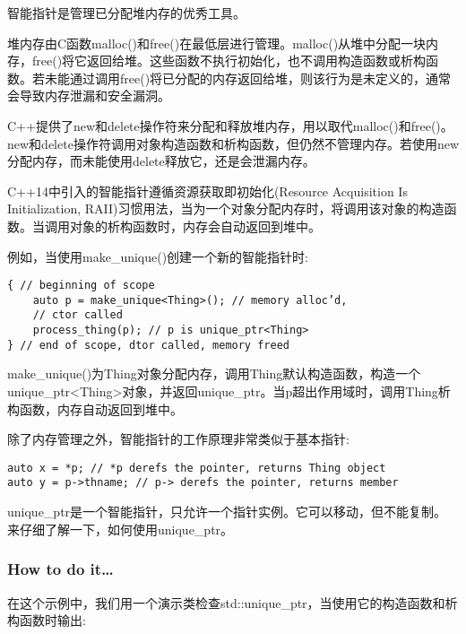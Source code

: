 
智能指针是管理已分配堆内存的优秀工具。

堆内存由C函数malloc()和free()在最低层进行管理。malloc()从堆中分配一块内存，free()将它返回给堆。这些函数不执行初始化，也不调用构造函数或析构函数。若未能通过调用free()将已分配的内存返回给堆，则该行为是未定义的，通常会导致内存泄漏和安全漏洞。

C++提供了new和delete操作符来分配和释放堆内存，用以取代malloc()和free()。new和delete操作符调用对象构造函数和析构函数，但仍然不管理内存。若使用new分配内存，而未能使用delete释放它，还是会泄漏内存。

C++14中引入的智能指针遵循资源获取即初始化(Resource Acquisition Is Initialization, RAII)习惯用法，当为一个对象分配内存时，将调用该对象的构造函数。当调用对象的析构函数时，内存会自动返回到堆中。

例如，当使用make\_unique()创建一个新的智能指针时:

\begin{lstlisting}[style=styleCXX]
{ // beginning of scope
	auto p = make_unique<Thing>(); // memory alloc’d,
	// ctor called
	process_thing(p); // p is unique_ptr<Thing>
} // end of scope, dtor called, memory freed
\end{lstlisting}

make\_unique()为Thing对象分配内存，调用Thing默认构造函数，构造一个unique\_ptr<Thing>对象，并返回unique\_ptr。当p超出作用域时，调用Thing析构函数，内存自动返回到堆中。

除了内存管理之外，智能指针的工作原理非常类似于基本指针:

\begin{lstlisting}[style=styleCXX]
auto x = *p; // *p derefs the pointer, returns Thing object
auto y = p->thname; // p-> derefs the pointer, returns member
\end{lstlisting}

unique\_ptr是一个智能指针，只允许一个指针实例。它可以移动，但不能复制。来仔细了解一下，如何使用unique\_ptr。

\subsubsection{How to do it…}

在这个示例中，我们用一个演示类检查std::unique\_ptr，当使用它的构造函数和析构函数时输出:


